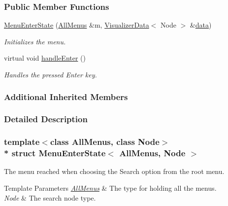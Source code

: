 \subsubsection*{Public Member Functions}
\begin{DoxyCompactItemize}
\item 
\hyperlink{structMenuEnterState_a0b4a90a46f3b206cb79c2b76b8b968c7}{Menu\+Enter\+State} (\hyperlink{structAllMenus}{All\+Menus} \&m, \hyperlink{structVisualizerData}{Visualizer\+Data}$<$ Node $>$ \&\hyperlink{structMenuBase_a819aaaa06ede3bffbb12c1390657ef64}{data})
\begin{DoxyCompactList}\small\item\em Initializes the menu. \end{DoxyCompactList}\item 
virtual void \hyperlink{structMenuEnterState_addaa157f0a6f83200ff3ca5efd90da7f}{handle\+Enter} ()\hypertarget{structMenuEnterState_addaa157f0a6f83200ff3ca5efd90da7f}{}\label{structMenuEnterState_addaa157f0a6f83200ff3ca5efd90da7f}

\begin{DoxyCompactList}\small\item\em Handles the pressed Enter key. \end{DoxyCompactList}\end{DoxyCompactItemize}
\subsubsection*{Additional Inherited Members}


\subsubsection{Detailed Description}
\subsubsection*{template$<$class All\+Menus, class Node$>$\\*
struct Menu\+Enter\+State$<$ All\+Menus, Node $>$}

The menu reached when choosing the Search option from the root menu. 


\begin{DoxyTemplParams}{Template Parameters}
{\em \hyperlink{structAllMenus}{All\+Menus}} & The type for holding all the menus. \\
\hline
{\em Node} & The search node type. \\
\hline
\end{DoxyTemplParams}


